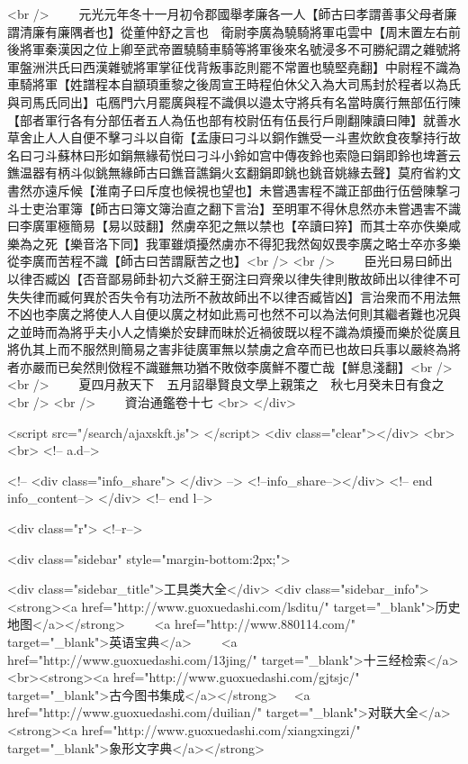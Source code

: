 <br />
　　元光元年冬十一月初令郡國舉孝廉各一人【師古曰孝謂善事父母者廉謂清廉有廉隅者也】從董仲舒之言也　衛尉李廣為驍騎將軍屯雲中【周末置左右前後將軍秦漢因之位上卿至武帝置驍騎車騎等將軍後來名號浸多不可勝紀謂之雜號將軍盤洲洪氏曰西漢雜號將軍掌征伐背叛事訖則罷不常置也驍堅堯翻】中尉程不識為車騎將軍【姓譜程本自顓頊重黎之後周宣王時程伯休父入為大司馬封於程者以為氏與司馬氏同出】屯鴈門六月罷廣與程不識俱以邉太守將兵有名當時廣行無部伍行陳【部者軍行各有分部伍者五人為伍也部有校尉伍有伍長行戶剛翻陳讀曰陣】就善水草舍止人人自便不擊刁斗以自衛【孟康曰刁斗以銅作鐎受一斗晝炊飲食夜撃持行故名曰刁斗蘇林曰形如鋗無緣荀悦曰刁斗小鈴如宫中傳夜鈴也索隐曰鋗即鈴也埤蒼云鐎温器有柄斗似銚無緣師古曰鐎音譙鋗火玄翻鋗即銚也銚音姚緣去聲】莫府省約文書然亦遠斥候【淮南子曰斥度也候視也望也】未嘗遇害程不識正部曲行伍營陳撃刁斗士吏治軍簿【師古曰簿文簿治直之翻下言治】至明軍不得休息然亦未嘗遇害不識曰李廣軍極簡易【易以豉翻】然虜卒犯之無以禁也【卒讀曰猝】而其士卒亦佚樂咸樂為之死【樂音洛下同】我軍雖煩擾然虜亦不得犯我然匈奴畏李廣之略士卒亦多樂從李廣而苦程不識【師古曰苦謂厭苦之也】<br />
<br />
　　臣光曰易曰師出以律否臧凶【否音鄙易師卦初六爻辭王弼注曰齊衆以律失律則散故師出以律律不可失失律而臧何異於否失令有功法所不赦故師出不以律否臧皆凶】言治衆而不用法無不凶也李廣之將使人人自便以廣之材如此焉可也然不可以為法何則其繼者難也况與之並時而為將乎夫小人之情樂於安肆而昧於近禍彼既以程不識為煩擾而樂於從廣且將仇其上而不服然則簡易之害非徒廣軍無以禁虜之倉卒而已也故曰兵事以嚴終為將者亦嚴而已矣然則傚程不識雖無功猶不敗傚李廣鮮不覆亡哉【鮮息淺翻】<br />
<br />
　　夏四月赦天下　五月詔舉賢良文學上親策之　秋七月癸未日有食之<br />
<br />
　　資治通鑑卷十七  <br>
   </div> 

<script src="/search/ajaxskft.js"> </script>
 <div class="clear"></div>
<br>
<br>
 <!-- a.d-->

 <!--
<div class="info_share">
</div> 
-->
 <!--info_share--></div>   <!-- end info_content-->
  </div> <!-- end l-->

<div class="r">   <!--r-->



<div class="sidebar"  style="margin-bottom:2px;">

 
<div class="sidebar_title">工具类大全</div>
<div class="sidebar_info">
<strong><a href="http://www.guoxuedashi.com/lsditu/" target="_blank">历史地图</a></strong>　　
<a href="http://www.880114.com/" target="_blank">英语宝典</a>　　
<a href="http://www.guoxuedashi.com/13jing/" target="_blank">十三经检索</a>　
<br><strong><a href="http://www.guoxuedashi.com/gjtsjc/" target="_blank">古今图书集成</a></strong>　
<a href="http://www.guoxuedashi.com/duilian/" target="_blank">对联大全</a>　<strong><a href="http://www.guoxuedashi.com/xiangxingzi/" target="_blank">象形文字典</a></strong>　

